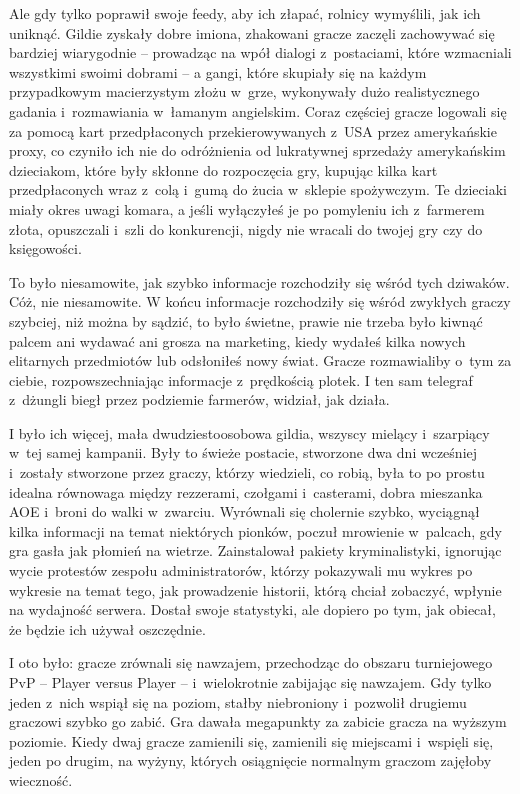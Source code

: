 \documentclass[oneside,polish,11pt,rmheadings]{mwbk}
\begin{document}
Ale gdy tylko poprawił swoje feedy, aby ich złapać, rolnicy wymyślili, jak ich uniknąć. Gildie zyskały dobre imiona, zhakowani gracze zaczęli zachowywać się bardziej wiarygodnie -- prowadząc na wpół dialogi z~postaciami, które wzmacniali wszystkimi swoimi dobrami -- a gangi, które skupiały się na każdym przypadkowym macierzystym złożu w~grze, wykonywały dużo realistycznego gadania i~rozmawiania w~łamanym angielskim. Coraz częściej gracze logowali się za pomocą kart przedpłaconych przekierowywanych z~USA przez amerykańskie proxy, co czyniło ich nie do odróżnienia od lukratywnej sprzedaży amerykańskim dzieciakom, które były skłonne do rozpoczęcia gry, kupując kilka kart przedpłaconych wraz z~colą i~gumą do żucia w~sklepie spożywczym. Te dzieciaki miały okres uwagi komara, a jeśli wyłączyłeś je po pomyleniu ich z~farmerem złota, opuszczali i~szli do konkurencji, nigdy nie wracali do twojej gry czy do księgowości.

To było niesamowite, jak szybko informacje rozchodziły się wśród tych dziwaków. Cóż, nie niesamowite. W końcu informacje rozchodziły się wśród zwykłych graczy szybciej, niż można by sądzić, to było świetne, prawie nie trzeba było kiwnąć palcem ani wydawać ani grosza na marketing, kiedy wydałeś kilka nowych elitarnych przedmiotów lub odsłoniłeś nowy świat. Gracze rozmawialiby o~tym za ciebie, rozpowszechniając informacje z~prędkością plotek. I ten sam telegraf z~dżungli biegł przez podziemie farmerów, widział, jak działa.

I było ich więcej, mała dwudziestoosobowa gildia, wszyscy mielący i~szarpiący w~tej samej kampanii. Były to świeże postacie, stworzone dwa dni wcześniej i~zostały stworzone przez graczy, którzy wiedzieli, co robią, była to po prostu idealna równowaga między rezzerami, czołgami i~casterami, dobra mieszanka AOE i~broni do walki w~zwarciu. Wyrównali się cholernie szybko, wyciągnął kilka informacji na temat niektórych pionków, poczuł mrowienie w~palcach, gdy gra gasła jak płomień na wietrze. Zainstalował pakiety kryminalistyki, ignorując wycie protestów zespołu administratorów, którzy pokazywali mu wykres po wykresie na temat tego, jak prowadzenie historii, którą chciał zobaczyć, wpłynie na wydajność serwera. Dostał swoje statystyki, ale dopiero po tym, jak obiecał, że będzie ich używał oszczędnie.

I oto było: gracze zrównali się nawzajem, przechodząc do obszaru turniejowego PvP -- Player versus Player -- i~wielokrotnie zabijając się nawzajem. Gdy tylko jeden z~nich wspiął się na poziom, stałby niebroniony i~pozwolił drugiemu graczowi szybko go zabić. Gra dawała megapunkty za zabicie gracza na wyższym poziomie. Kiedy dwaj gracze zamienili się, zamienili się miejscami i~wspięli się, jeden po drugim, na wyżyny, których osiągnięcie normalnym graczom zajęłoby wieczność.
\end{document}
